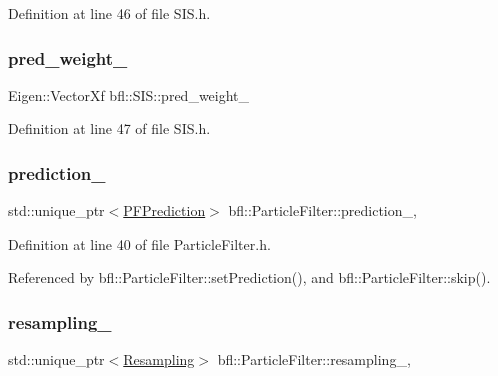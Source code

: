 Definition at line 46 of file S\+I\+S.\+h.

\mbox{\label{classbfl_1_1SIS_a736b0b1a524f96273201f82d153f55d2}} 
\subsubsection{\texorpdfstring{pred\+\_\+weight\+\_\+}{pred\_weight\_}}
{\footnotesize\ttfamily Eigen\+::\+Vector\+Xf bfl\+::\+S\+I\+S\+::pred\+\_\+weight\+\_\+\hspace{0.3cm}{\ttfamily [protected]}}



Definition at line 47 of file S\+I\+S.\+h.

\mbox{\label{classbfl_1_1ParticleFilter_ab86f707d29a823423fe35de37e8f9d8e}} 
\subsubsection{\texorpdfstring{prediction\+\_\+}{prediction\_}}
{\footnotesize\ttfamily std\+::unique\+\_\+ptr$<$\mbox{\hyperlink{classbfl_1_1PFPrediction}{P\+F\+Prediction}}$>$ bfl\+::\+Particle\+Filter\+::prediction\+\_\+\hspace{0.3cm}{\ttfamily [protected]}, {\ttfamily [inherited]}}



Definition at line 40 of file Particle\+Filter.\+h.



Referenced by bfl\+::\+Particle\+Filter\+::set\+Prediction(), and bfl\+::\+Particle\+Filter\+::skip().

\mbox{\label{classbfl_1_1ParticleFilter_a9b0b855942fa4fb847443b10fe26c589}} 
\subsubsection{\texorpdfstring{resampling\+\_\+}{resampling\_}}
{\footnotesize\ttfamily std\+::unique\+\_\+ptr$<$\mbox{\hyperlink{classbfl_1_1Resampling}{Resampling}}$>$ bfl\+::\+Particle\+Filter\+::resampling\+\_\+\hspace{0.3cm}{\ttfamily [protected]}, {\ttfamily [inherited]}}



